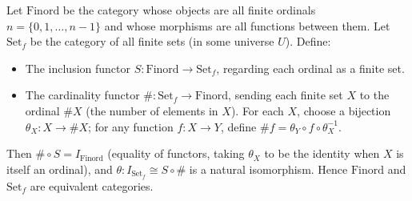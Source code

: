 Let $\text{Finord}$ be the category whose objects are all finite ordinals $n = \{0, 1, \ldots, n-1\}$ and whose morphisms are all functions between them. Let $\text{Set}_f$ be the category of all finite sets (in some universe $U$). Define:
\begin{itemize}
\item The inclusion functor $S: \text{Finord} \rightarrow \text{Set}_f$, regarding each ordinal as a finite set.
\item The cardinality functor $\#: \text{Set}_f \rightarrow \text{Finord}$, sending each finite set $X$ to the ordinal $\# X$ (the number of elements in $X$). For each $X$, choose a bijection $\theta_X: X \rightarrow \# X$; for any function $f: X \rightarrow Y$, define $\# f = \theta_Y \circ f \circ \theta_X^{-1}$.
\end{itemize}
Then $\# \circ S = I_{\text{Finord}}$ (equality of functors, taking $\theta_X$ to be the identity when $X$ is itself an ordinal), and $\theta: I_{\text{Set}_f} \cong S \circ \#$ is a natural isomorphism. Hence $\text{Finord}$ and $\text{Set}_f$ are equivalent categories.
